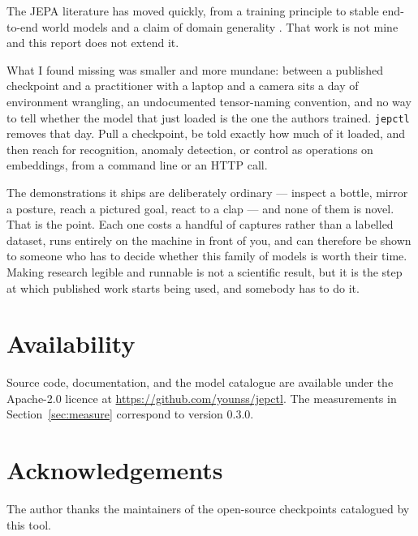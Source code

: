 \documentclass[11pt,onecolumn]{article}
\newcommand{\jepctl}{\texttt{jepctl}}
\begin{document}
The JEPA literature has moved quickly, from a training principle \cite{lecun2022path} to
stable end-to-end world models \cite{lewm2026} and a claim of domain generality
\cite{jepaanything2026}. That work is not mine and this report does not extend it.

What I found missing was smaller and more mundane: between a published checkpoint and a
practitioner with a laptop and a camera sits a day of environment wrangling, an
undocumented tensor-naming convention, and no way to tell whether the model that just
loaded is the one the authors trained. \jepctl{} removes that day. Pull a checkpoint, be
told exactly how much of it loaded, and then reach for recognition, anomaly detection, or
control as operations on embeddings, from a command line or an HTTP call.

The demonstrations it ships are deliberately ordinary --- inspect a bottle, mirror a
posture, reach a pictured goal, react to a clap --- and none of them is novel. That is the
point. Each one costs a handful of captures rather than a labelled dataset, runs entirely
on the machine in front of you, and can therefore be shown to someone who has to decide
whether this family of models is worth their time. Making research legible and runnable
is not a scientific result, but it is the step at which published work starts being used,
and somebody has to do it.

\section*{Availability}

Source code, documentation, and the model catalogue are available under the Apache-2.0
licence at \url{https://github.com/younss/jepctl}. The measurements in
Section~\ref{sec:measure} correspond to version 0.3.0.

\section*{Acknowledgements}

The author thanks the maintainers of the open-source checkpoints catalogued by this tool.



\end{document}
